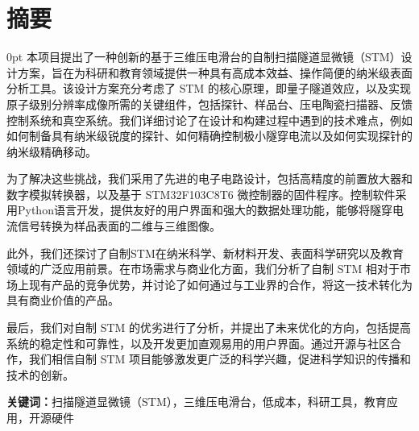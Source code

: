 \documentclass[zihao=-4]{ctexart}
\newcommand{\setParDis}{\setlength {\parskip} {0pt} }
\begin{document}
\section*{摘要}
{}
\begin{spacing}{1.5}
\setParDis %
本项目提出了一种创新的基于三维压电滑台的自制扫描隧道显微镜（STM）设计方案，旨在为科研和教育领域提供一种具有高成本效益、操作简便的纳米级表面分析工具。该设计方案充分考虑了 STM 的核心原理，即量子隧道效应，以及实现原子级别分辨率成像所需的关键组件，包括探针、样品台、压电陶瓷扫描器、反馈控制系统和真空系统。我们详细讨论了在设计和构建过程中遇到的技术难点，例如如何制备具有纳米级锐度的探针、如何精确控制极小隧穿电流以及如何实现探针的纳米级精确移动。

为了解决这些挑战，我们采用了先进的电子电路设计，包括高精度的前置放大器和数字模拟转换器，以及基于 STM32F103C8T6 微控制器的固件程序。控制软件采用Python语言开发，提供友好的用户界面和强大的数据处理功能，能够将隧穿电流信号转换为样品表面的二维与三维图像。

此外，我们还探讨了自制STM在纳米科学、新材料开发、表面科学研究以及教育领域的广泛应用前景。在市场需求与商业化方面，我们分析了自制 STM 相对于市场上现有产品的竞争优势，并讨论了如何通过与工业界的合作，将这一技术转化为具有商业价值的产品。

最后，我们对自制 STM 的优劣进行了分析，并提出了未来优化的方向，包括提高系统的稳定性和可靠性，以及开发更加直观易用的用户界面。通过开源与社区合作，我们相信自制 STM 项目能够激发更广泛的科学兴趣，促进科学知识的传播和技术的创新。
  

\end{spacing}
    
\textbf{关键词：}扫描隧道显微镜（STM），三维压电滑台，低成本，科研工具，教育应用，开源硬件

\newpage
\end{document}
